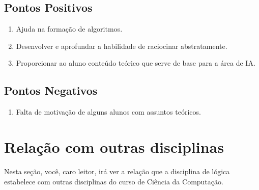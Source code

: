 \documentclass[a4paper]{article}
\begin{document}
\subsection{Pontos Positivos}
\begin{enumerate}
\item Ajuda na formação de algoritmos.
\item Desenvolver e aprofundar  a habilidade de raciocinar abstratamente. 
\item Proporcionar ao aluno conteúdo teórico que serve de base para a área de IA.
\end{enumerate}
\subsection{Pontos Negativos}
\begin{enumerate}
\item Falta de motivação de alguns alunos com assuntos teóricos.
\end{enumerate}
\section{Relação com outras disciplinas}
Nesta seção, você, caro leitor, irá ver a relação que a disciplina de lógica estabelece com outras disciplinas do curso de Ciência da Computação.\cite{Perfil_Curricular}
\end{document}
